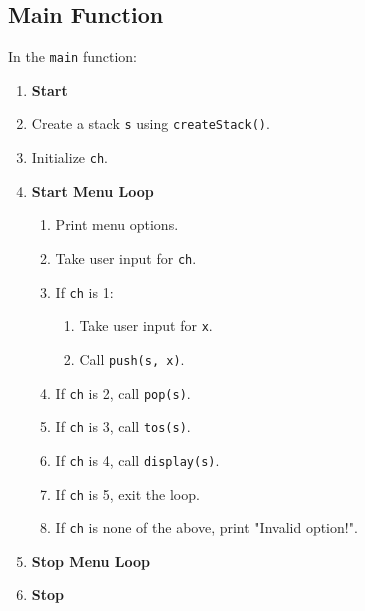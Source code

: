 {  \subsection{Main Function}
  In the \texttt{main} function:
  \begin{enumerate}[label=\arabic*:, start=1]
    \item \textbf{Start}
    \item Create a stack \texttt{s} using \texttt{createStack()}.
    \item Initialize \texttt{ch}.
    \item \textbf{Start Menu Loop}
          \begin{enumerate}[label=4.\arabic*:, start=1]
            \item Print menu options.
            \item Take user input for \texttt{ch}.
            \item If \texttt{ch} is 1:
                  \begin{enumerate}[label=4.1.\arabic*:, start=1]
                    \item Take user input for \texttt{x}.
                    \item Call \texttt{push(s, x)}.
                  \end{enumerate}
            \item If \texttt{ch} is 2, call \texttt{pop(s)}.
            \item If \texttt{ch} is 3, call \texttt{tos(s)}.
            \item If \texttt{ch} is 4, call \texttt{display(s)}.
            \item If \texttt{ch} is 5, exit the loop.
            \item If \texttt{ch} is none of the above, print "Invalid option!".
          \end{enumerate}
    \item \textbf{Stop Menu Loop}
    \item \textbf{Stop}
  \end{enumerate}
 }



